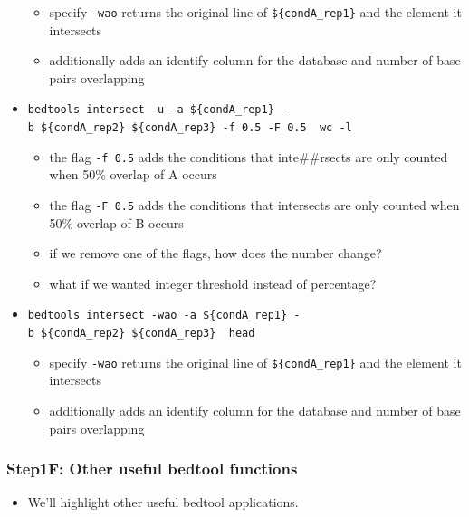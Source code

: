 \documentclass[
]{book}
\providecommand{\tightlist}{%
  \setlength{\itemsep}{0pt}\setlength{\parskip}{0pt}}
\begin{document}
\begin{itemize}
  \begin{itemize}
  \tightlist
  \item
    specify \texttt{-wao} returns the original line of \texttt{\$\{condA\_rep1\}} and the element it intersects
  \item
    additionally adds an identify column for the database and number of base pairs overlapping
  \end{itemize}
\item
  \texttt{bedtools\ intersect\ -u\ -a\ \$\{condA\_rep1\}\ -b\ \$\{condA\_rep2\}\ \$\{condA\_rep3\}\ -f\ 0.5\ -F\ 0.5\ \textbar{}\ wc\ -l}

  \begin{itemize}
  \tightlist
  \item
    the flag \texttt{-f\ 0.5} adds the conditions that inte\#\#rsects are only counted when 50\% overlap of A occurs
  \item
    the flag \texttt{-F\ 0.5} adds the conditions that intersects are only counted when 50\% overlap of B occurs
  \item
    if we remove one of the flags, how does the number change?
  \item
    what if we wanted integer threshold instead of percentage?
  \end{itemize}
\item
  \texttt{bedtools\ intersect\ -wao\ -a\ \$\{condA\_rep1\}\ -b\ \$\{condA\_rep2\}\ \$\{condA\_rep3\}\ \textbar{}\ head}

  \begin{itemize}
  \tightlist
  \item
    specify \texttt{-wao} returns the original line of \texttt{\$\{condA\_rep1\}} and the element it intersects
  \item
    additionally adds an identify column for the database and number of base pairs overlapping
  \end{itemize}
\end{itemize}

\subsubsection{Step1F: Other useful bedtool functions}\label{step1f-other-useful-bedtool-functions}

\begin{itemize}
\tightlist
\item
  We'll highlight other useful bedtool applications.
\end{itemize}
\end{document}
